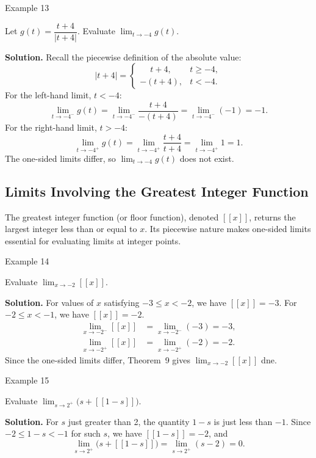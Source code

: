 \begin{examplebox}{Example 13}

Let \(g(t) = \dfrac{t + 4}{|t + 4|}\). Evaluate \(\displaystyle\lim_{t \to -4} g(t)\).

\medskip
\textbf{Solution.}
Recall the piecewise definition of the absolute value:
\[
|t + 4| = \begin{cases}
\phantom{-}t + 4,  & t \ge -4, \\[4pt]
-(t + 4),          & t < -4.
\end{cases}
\]
For the left-hand limit, \(t < -4\):
\[
\lim_{t \to -4^{-}} g(t) = \lim_{t \to -4^{-}} \frac{t + 4}{-(t + 4)} = \lim_{t \to -4^{-}} (-1) = -1.
\]
For the right-hand limit, \(t > -4\):
\[
\lim_{t \to -4^{+}} g(t) = \lim_{t \to -4^{+}} \frac{t + 4}{t + 4} = \lim_{t \to -4^{+}} 1 = 1.
\]
The one-sided limits differ, so \(\displaystyle\lim_{t \to -4} g(t)\) does not exist.
\end{examplebox}

\bigskip


\subsection*{Limits Involving the Greatest Integer Function}
\label{subsec:1.2.3}


The greatest integer function (or floor function), denoted \([\![x]\!]\), returns the largest integer less than or equal to \(x\). Its piecewise nature makes one-sided limits essential for evaluating limits at integer points.


\begin{examplebox}{Example 14}

Evaluate \(\displaystyle\lim_{x \to -2} [\![x]\!]\).

\medskip
\textbf{Solution.}
For values of \(x\) satisfying \(-3 \le x < -2\), we have \([\![x]\!] = -3\). For \(-2 \le x < -1\), we have \([\![x]\!] = -2\).
\begin{align*}
\lim_{x \to -2^{-}} [\![x]\!] &= \lim_{x \to -2^{-}} (-3) = -3,\\[6pt]
\lim_{x \to -2^{+}} [\![x]\!] &= \lim_{x \to -2^{+}} (-2) = -2.
\end{align*}
Since the one-sided limits differ, Theorem~9 gives \(\displaystyle\lim_{x \to -2} [\![x]\!]\) dne.
\end{examplebox}


\begin{examplebox}{Example 15}

Evaluate \(\displaystyle\lim_{s \to 2^{+}} \bigl(s + [\![1 - s]\!]\bigr)\).

\medskip
\textbf{Solution.}
For \(s\) just greater than 2, the quantity \(1 - s\) is just less than \(-1\). Since \(-2 \le 1 - s < -1\) for such \(s\), we have \([\![1 - s]\!] = -2\), and
\[
\lim_{s \to 2^{+}} \bigl(s + [\![1 - s]\!]\bigr)
    = \lim_{s \to 2^{+}} (s - 2) = 0.
\]
\end{examplebox}


